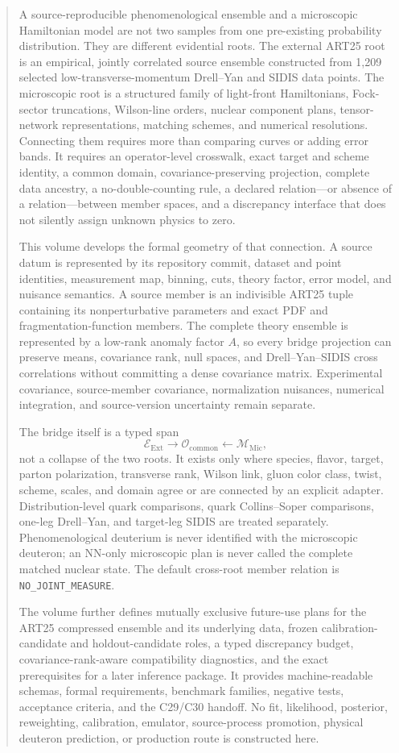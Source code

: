 \documentclass[11pt]{article}
\newcommand{\cO}{\mathcal O}
\newcommand{\cM}{\mathcal M}
\newcommand{\cE}{\mathcal E}
\newcommand{\Ext}{\ensuremath{\mathrm{Ext}}}
\newcommand{\Mic}{\ensuremath{\mathrm{Mic}}}
\begin{document}
\begin{abstract}
A source-reproducible phenomenological ensemble and a microscopic Hamiltonian model are not two samples from one pre-existing probability distribution.  They are different evidential roots.  The external ART25 root is an empirical, jointly correlated source ensemble constructed from 1,209 selected low-transverse-momentum Drell--Yan and SIDIS data points.  The microscopic root is a structured family of light-front Hamiltonians, Fock-sector truncations, Wilson-line orders, nuclear component plans, tensor-network representations, matching schemes, and numerical resolutions.  Connecting them requires more than comparing curves or adding error bands.  It requires an operator-level crosswalk, exact target and scheme identity, a common domain, covariance-preserving projection, complete data ancestry, a no-double-counting rule, a declared relation---or absence of a relation---between member spaces, and a discrepancy interface that does not silently assign unknown physics to zero.

This volume develops the formal geometry of that connection.  A source datum is represented by its repository commit, dataset and point identities, measurement map, binning, cuts, theory factor, error model, and nuisance semantics.  A source member is an indivisible ART25 tuple containing its nonperturbative parameters and exact PDF and fragmentation-function members.  The complete theory ensemble is represented by a low-rank anomaly factor \(A\), so every bridge projection can preserve means, covariance rank, null spaces, and Drell--Yan--SIDIS cross correlations without committing a dense covariance matrix.  Experimental covariance, source-member covariance, normalization nuisances, numerical integration, and source-version uncertainty remain separate.

The bridge itself is a typed span
\[
 \cE_{\Ext}\longrightarrow \cO_{\mathrm{common}}\longleftarrow \cM_{\Mic},
\]
not a collapse of the two roots.  It exists only where species, flavor, target, parton polarization, transverse rank, Wilson link, gluon color class, twist, scheme, scales, and domain agree or are connected by an explicit adapter.  Distribution-level quark comparisons, quark Collins--Soper comparisons, one-leg Drell--Yan, and target-leg SIDIS are treated separately.  Phenomenological deuterium is never identified with the microscopic deuteron; an NN-only microscopic plan is never called the complete matched nuclear state.  The default cross-root member relation is \texttt{NO\_JOINT\_MEASURE}.

The volume further defines mutually exclusive future-use plans for the ART25 compressed ensemble and its underlying data, frozen calibration-candidate and holdout-candidate roles, a typed discrepancy budget, covariance-rank-aware compatibility diagnostics, and the exact prerequisites for a later inference package.  It provides machine-readable schemas, formal requirements, benchmark families, negative tests, acceptance criteria, and the C29/C30 handoff.  No fit, likelihood, posterior, reweighting, calibration, emulator, source-process promotion, physical deuteron prediction, or production route is constructed here.
\end{abstract}
\end{document}
